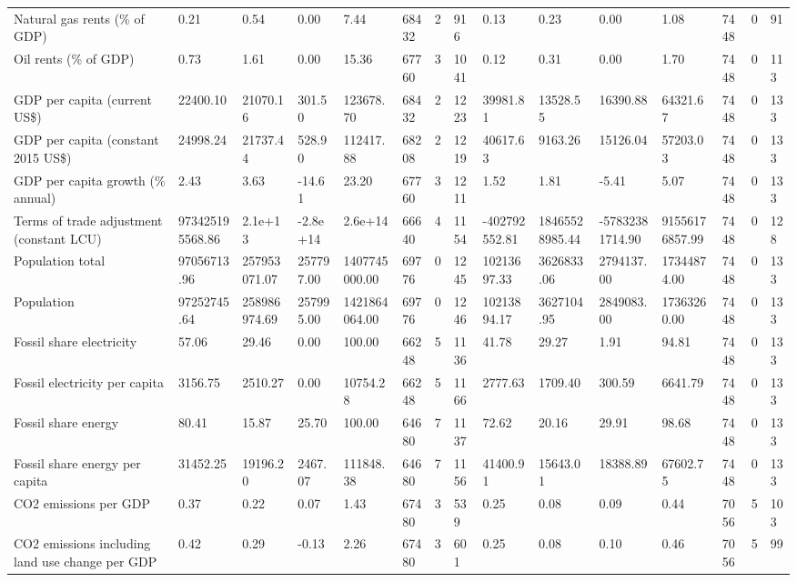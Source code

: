 \begin{longtable}{lllllllllllllll}
\addlinespace
Natural gas rents (\% of GDP) & 0.21 & 0.54 & 0.00 & 7.44 & 68432 & 2 & 916 & 0.13 & 0.23 & 0.00 & 1.08 & 7448 & 0 & 91\\
Oil rents (\% of GDP) & 0.73 & 1.61 & 0.00 & 15.36 & 67760 & 3 & 1041 & 0.12 & 0.31 & 0.00 & 1.70 & 7448 & 0 & 113\\
GDP per capita (current US\$) & 22400.10 & 21070.16 & 301.50 & 123678.70 & 68432 & 2 & 1223 & 39981.81 & 13528.55 & 16390.88 & 64321.67 & 7448 & 0 & 133\\
GDP per capita (constant 2015 US\$) & 24998.24 & 21737.44 & 528.90 & 112417.88 & 68208 & 2 & 1219 & 40617.63 & 9163.26 & 15126.04 & 57203.03 & 7448 & 0 & 133\\
GDP per capita growth (\% annual) & 2.43 & 3.63 & -14.61 & 23.20 & 67760 & 3 & 1211 & 1.52 & 1.81 & -5.41 & 5.07 & 7448 & 0 & 133\\
\addlinespace
Terms of trade adjustment (constant LCU) & 973425195568.86 & 2.1e+13 & -2.8e+14 & 2.6e+14 & 66640 & 4 & 1154 & -402792552.81 & 18465528985.44 & -57832381714.90 & 91556176857.99 & 7448 & 0 & 128\\
Population total & 97056713.96 & 257953071.07 & 257797.00 & 1407745000.00 & 69776 & 0 & 1245 & 10213697.33 & 3626833.06 & 2794137.00 & 17344874.00 & 7448 & 0 & 133\\
Population & 97252745.64 & 258986974.69 & 257995.00 & 1421864064.00 & 69776 & 0 & 1246 & 10213894.17 & 3627104.95 & 2849083.00 & 17363260.00 & 7448 & 0 & 133\\
Fossil share electricity & 57.06 & 29.46 & 0.00 & 100.00 & 66248 & 5 & 1136 & 41.78 & 29.27 & 1.91 & 94.81 & 7448 & 0 & 133\\
Fossil electricity per capita & 3156.75 & 2510.27 & 0.00 & 10754.28 & 66248 & 5 & 1166 & 2777.63 & 1709.40 & 300.59 & 6641.79 & 7448 & 0 & 133\\
\addlinespace
Fossil share energy & 80.41 & 15.87 & 25.70 & 100.00 & 64680 & 7 & 1137 & 72.62 & 20.16 & 29.91 & 98.68 & 7448 & 0 & 133\\
Fossil share energy per capita & 31452.25 & 19196.20 & 2467.07 & 111848.38 & 64680 & 7 & 1156 & 41400.91 & 15643.01 & 18388.89 & 67602.75 & 7448 & 0 & 133\\
CO2 emissions per GDP & 0.37 & 0.22 & 0.07 & 1.43 & 67480 & 3 & 539 & 0.25 & 0.08 & 0.09 & 0.44 & 7056 & 5 & 103\\
CO2 emissions including land use change per GDP & 0.42 & 0.29 & -0.13 & 2.26 & 67480 & 3 & 601 & 0.25 & 0.08 & 0.10 & 0.46 & 7056 & 5 & 99\\

\end{longtable}
